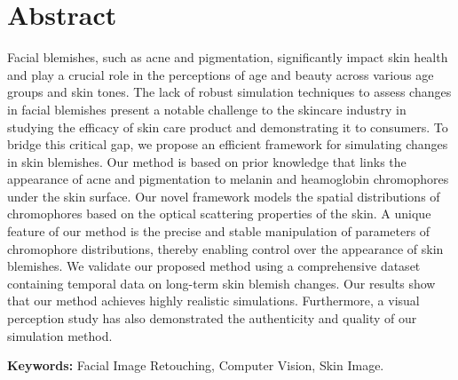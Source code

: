 \newpage

\chapter*{\centering Abstract}

\begin{spacing}{1.5}
\setlength{\parskip}{0.3in}


Facial blemishes, such as acne and pigmentation, significantly impact skin health and play a crucial role in the perceptions of age and beauty across various age groups and skin tones. The lack of robust simulation techniques to assess changes in facial blemishes present a notable challenge to the skincare industry in studying the efficacy of skin care product and demonstrating it to consumers. To bridge this critical gap, we propose an efficient framework for simulating changes in skin blemishes. Our method is based on prior knowledge that links the appearance of acne and pigmentation to melanin and heamoglobin chromophores under the skin surface. Our novel framework models the spatial distributions of chromophores based on the optical scattering properties of the skin. A unique feature of our method is the precise and stable manipulation of parameters of chromophore distributions, thereby enabling control over the appearance of skin blemishes. We validate our proposed method using a comprehensive dataset containing temporal data on long-term skin blemish changes. Our results show that our method achieves highly realistic simulations. Furthermore, a visual perception study has also demonstrated the authenticity and quality of our simulation method.

\par
\textbf{Keywords:} Facial Image Retouching, Computer Vision, Skin Image.
\end{spacing}
\newpage
